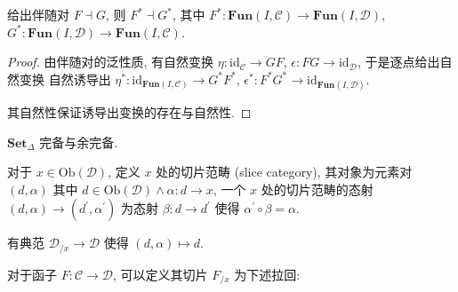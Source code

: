 \begin{lemma}
    给出伴随对 \(F \dashv G\), 则 \(F^\ast \dashv G^\ast\), 其中 \(F^\ast : \mathbf{Fun} (I,\mathcal{C}) \to \mathbf{Fun} (I,\mathcal{D})\),
    \(G^\ast : \mathbf{Fun} (I,\mathcal{D}) \to \mathbf{Fun} (I,\mathcal{C})\).

    \begin{proof}
        由伴随对的泛性质, 有自然变换 \(\eta : \mathrm{id}_{\mathcal{C}} \to G F\), \(\epsilon : F G \to \mathrm{id}_{\mathcal{D}}\), 于是逐点给出自然变换
        自然诱导出 \(\eta^\ast : \mathrm{id}_{\mathbf{Fun} (I,\mathcal{C})} \to G^\ast F^\ast\), \(\epsilon^\ast : F^\ast G^\ast \to \mathrm{id}_{\mathbf{Fun} (I,\mathcal{D})}\).

        其自然性保证诱导出变换的存在与自然性.
    \end{proof}
\end{lemma}

\begin{lemma}
    \(\mathbf{Set}_{\Delta}\) 完备与余完备.
\end{lemma}

\begin{definition}
    对于 \(x \in \mathrm{Ob} (\mathcal{D})\), 定义 \(x\) 处的切片范畴 (slice category),
    其对象为元素对 \((d,\alpha)\) 其中 \(d \in \mathrm{Ob} (\mathcal{D}) \land \alpha : d \to x\),
    一个 \(x\) 处的切片范畴的态射 \((d,\alpha) \to (d^\prime,\alpha^\prime)\) 为态射 \(\beta : d \to d^\prime\) 使得 \(\alpha^\prime \circ \beta = \alpha\).
\end{definition}

\begin{remark}
    有典范 \(\mathcal{D}_{/x} \to \mathcal{D}\) 使得 \((d,\alpha) \mapsto d\).
\end{remark}

\begin{definition}
    对于函子 \(F : \mathcal{C} \to \mathcal{D}\), 可以定义其切片 \(F_{/x}\) 为下述拉回:

    \begin{center}
    \end{center}
\end{definition}

